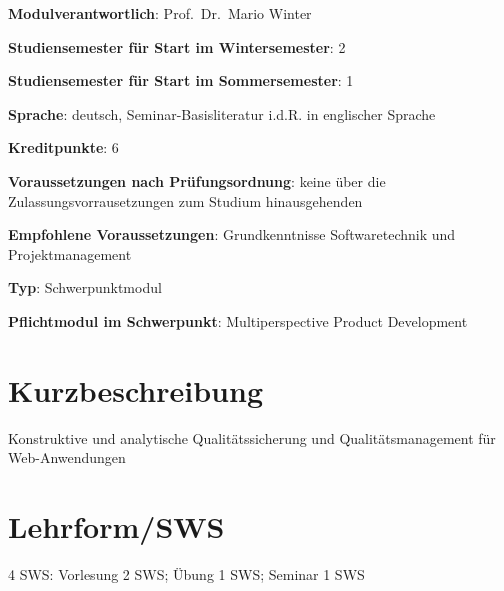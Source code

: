 \begin{modulHead}
\textbf{Modulverantwortlich}: Prof.~Dr.~Mario
Winter
\end{modulHead}
\begin{modulHead}
\textbf{Studiensemester für
Start im Wintersemester}:
2
\end{modulHead}
\begin{modulHead}
\textbf{Studiensemester für Start
im Sommersemester}:
1
\end{modulHead}
\begin{modulHead}
\textbf{Sprache}: deutsch,
Seminar-Basisliteratur i.d.R. in englischer
Sprache
\end{modulHead}
\begin{modulHead}
\textbf{Kreditpunkte}:
6
\end{modulHead}
\begin{modulHead}
\textbf{Voraussetzungen nach
Prüfungsordnung}: keine über die Zulassungsvorrausetzungen zum Studium
hinausgehenden
\end{modulHead}
\begin{modulHead}
\textbf{Empfohlene
Voraussetzungen}: Grundkenntnisse Softwaretechnik und
Projektmanagement
\end{modulHead}
\begin{modulHead}
\textbf{Typ}:
Schwerpunktmodul
\end{modulHead}
\begin{modulHead}
\textbf{Pflichtmodul
im Schwerpunkt}: Multiperspective Product Development
\end{modulHead}


\section*{Kurzbeschreibung\label{/mi-2017/modulbeschreibungen-master/MA_WTW_Modul_QUS_Winter}}\label{kurzbeschreibungpathlabelmi-2017modulbeschreibungen-mastermaux5fwtwux5fmodulux5fqusux5fwinter}

Konstruktive und analytische Qualitätssicherung und Qualitätsmanagement
für Web-Anwendungen

\section*{Lehrform/SWS
\label{/mi-2017/modulbeschreibungen-master/MA_WTW_Modul_QUS_Winter}}\label{lehrformsws-pathlabelmi-2017modulbeschreibungen-mastermaux5fwtwux5fmodulux5fqusux5fwinter}

4 SWS: Vorlesung 2 SWS; Übung 1 SWS; Seminar 1 SWS

